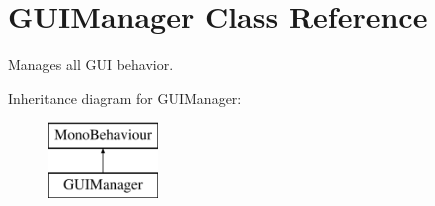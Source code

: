 \hypertarget{class_g_u_i_manager}{}\section{G\+U\+I\+Manager Class Reference}
\label{class_g_u_i_manager}


Manages all G\+U\+I behavior.  


Inheritance diagram for G\+U\+I\+Manager\+:\begin{figure}[H]
\begin{center}
\leavevmode
\includegraphics[height=2.000000cm]{class_g_u_i_manager}
\end{center}
\end{figure}
